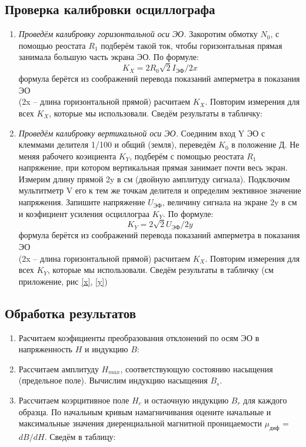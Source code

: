 \documentclass[14pt,a4paper]{article}
\begin{document}
\subsection*{Проверка калибровки осциллографа}
\begin{enumerate}
  \item \textit{Проведём калибровку горизонтальной оси ЭО.} Закоротим обмотку $N_0$, с помощью реостата  $R_1$ подберём такой ток, чтобы горизонтальная прямая занимала большую часть экрана ЭО. По формуле:
  $$K_X=2R_0\sqrt{2}I_\text{ЭФ} / 2x$$
  \footnotesize формула берётся из соображений перевода показаний амперметра в показания ЭО \normalsize\\
  (2x -- длина горизонтальной прямой) расчитаем $K_X$. Повторим измерения для всех $K_X$, которые мы использовали. Сведём результаты в табличку:
  
  \item \textit{Проведём калибровку вертикальной оси ЭО.} Соединим
  вход Y ЭО с клеммами делителя 1/100 и общий (земля), переведём $K_0$ в положение Д. Не меняя рабочего коэициента $K_Y$, подберём с
  помощью реостата $R_1$ напряжение, при котором вертикальная прямая занимает почти весь экран. Измерим длину прямой 2y в см (двойную амплитуду
  сигнала).
  Подключим мультитметр V его к тем же
  точкам делителя и определим эективное значение напряжения.
  Запишите напряжение $U_\text{ЭФ}$, величину сигнала на экране 2y в см и коэфициент усиления осциллограа $K_Y$. По формуле:
  $$K_Y=2\sqrt{2}U_\text{ЭФ} / 2y$$
  \footnotesize формула берётся из соображений перевода показаний амперметра в показания ЭО \normalsize\\
  (2x -- длина горизонтальной прямой) расчитаем $K_X$.
  Повторим измерения для всех $K_Y$, которые мы использовали. Сведём результаты в табличку (см приложение, рис \ref{x}, \ref{y})
\end{enumerate}


\subsection*{Обработка результатов}
\begin{enumerate}
  \item Расчитаем коэфициенты преобразования отклонений по осям ЭО в напряженность $H$ и индукцию $B$:
  \item Рассчитаем амплитуду
  $H_{max}$, соответствующую состоянию насыщения (предельное поле). Вычислим индукцию насыщения $B_s$.
  \item Рассчитаем коэрцитивное поле $H_c$ и остаочную индукцию $B_r$ для каждого образца. По начальным кривым намагничивания оцените начальные и максимальные
значения диеренциальной магнитной проницаемости $\mu_\text{диф}$ = $dB/dH$.
  Сведём в таблицу:
\end{enumerate}
\end{document}
